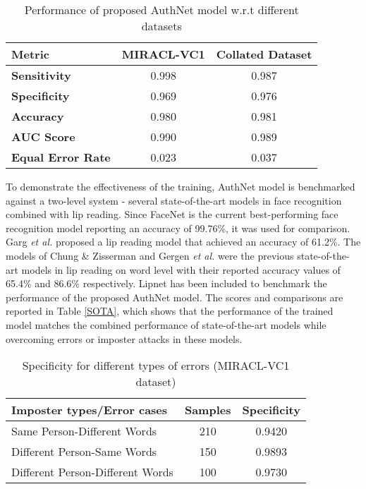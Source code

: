 \documentclass[letterpaper]{article}
\begin{document}
\begin{table}[h!]
\centering
\caption{Performance of proposed AuthNet model w.r.t different datasets}
\begin{tabular}{l c c}
\hline
\textbf{Metric} &       \textbf{MIRACL-VC1} & \textbf{Collated Dataset} \\ \hline
\textbf{Sensitivity}     & 0.998             & 0.987         \\ \textbf{Specificity}     & 0.969             & 0.976         \\ \textbf{Accuracy}        & 0.980             & 0.981         \\ \textbf{AUC Score}       & 0.990             & 0.989         \\ \textbf{Equal Error Rate}& 0.023             & 0.037         \\ \hline
\end{tabular}
\label{results}
\end{table}

To demonstrate the effectiveness of the training, AuthNet model is benchmarked against a two-level system -  several state-of-the-art models in face recognition combined with lip reading. Since FaceNet \cite{facenet} is the current best-performing face recognition model reporting an accuracy of 99.76\%, it was used for comparison. Garg \textit{et al. }\cite{stanford} proposed a lip reading model that achieved an accuracy of 61.2\%. The models of Chung \& Zisserman \cite{Chung} and Gergen \textit{et al.} \cite{gergen2016dynamic} were the previous state-of-the-art models in lip reading on word level with their reported accuracy values of 65.4\% and 86.6\% respectively. Lipnet \cite{DBLP:journals/corr/abs-1807-05162}  has been included to benchmark the performance of the proposed AuthNet model. The scores and comparisons are reported in Table \ref{SOTA}, which shows that the performance of the  trained model matches the combined performance of state-of-the-art models while overcoming errors or imposter attacks in these models.

\begin{table}[h!]
\centering
\caption{Specificity for different types of errors (MIRACL-VC1 dataset)}
\setlength{\tabcolsep}{4pt}
\renewcommand{\arraystretch}{1.2}
\begin{tabular}{p{4.69cm} c c}
\hline
\textbf{Imposter types/Error cases} &  \textbf{Samples} & \textbf{Specificity} \\ \hline
Same Person-Different Words       & 210   & 0.9420               \\ Different Person-Same Words        & 150   & 0.9893            \\ Different Person-Different Words  & 100   & 0.9730         \\ \hline
\end{tabular}
\label{errors}
\end{table}
\end{document}
